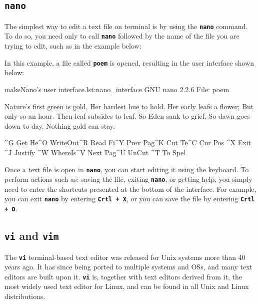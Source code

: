 \subsection{\textbf{\texttt{nano}}}

The simplest way to edit a text file on terminal is by using the \textbf{\texttt{nano}} command. To do so, you need only to call \textbf{\texttt{nano}} followed by the name of the file you are trying to edit, such as in the example below:

In this example, a file called \textbf{\texttt{poem}} is opened, resulting in the user interface shown below:

\begin{source_code_float}{make}{Nano's user interface.}{lst:nano_interface}
GNU nano 2.2.6         File: poem

Nature's first green is gold,
Her hardest hue to hold.
Her early leafs a flower;
But only so an hour.
Then leaf subsides to leaf.
So Eden sank to grief,
So dawn goes down to day.
Nothing gold can stay.

^G Get He^O WriteOut^R Read Fi^Y Prev Pag^K Cut Te^C Cur Pos
^X Exit  ^J Justify ^W WhereIs^V Next Pag^U UnCut ^T To Spel
\end{source_code_float}

Once a text file is open in \textbf{\texttt{nano}}, you can start editing it using the keyboard. To perform actions such as:  saving the file, exiting \textbf{\texttt{nano}}, or getting help, you simply need to enter the shortcuts presented at the bottom of the interface. For example, you can exit \textbf{\texttt{nano}} by entering \textbf{\texttt{Crtl + X}}, or you can save the file by entering \textbf{\texttt{Crtl + O}}.

\subsection{\textbf{\texttt{vi}} and \textbf{\texttt{vim}}}

The \textbf{\texttt{vi}} terminal-based text editor was released for Unix systems more than 40 years ago. It has since being ported to multiple systems and \acs{OS}s, and many text editors are built upon it. \textbf{\texttt{vi}} is, together with text editors derived from it, the most widely used text editor for Linux, and can be found in all Unix and Linux distributions.

